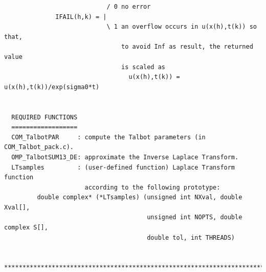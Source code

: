 \documentclass[a4paper,10pt]{report}%
\begin{document}
\begin{lstlisting}
                            / 0 no error
              IFAIL(h,k) = |
                            \ 1 an overflow occurs in u(x(h),t(k)) so that,
                                to avoid Inf as result, the returned value
                                is scaled as
                                  u(x(h),t(k)) = u(x(h),t(k))/exp(sigma0*t)


  REQUIRED FUNCTIONS
  ==================
  COM_TalbotPAR     : compute the Talbot parameters (in COM_Talbot_pack.c).
  OMP_TalbotSUM13_DE: approximate the Inverse Laplace Transform.
  LTsamples         : (user-defined function) Laplace Transform function
                      according to the following prototype:
         double complex* (*LTsamples) (unsigned int NXval, double Xval[],
                                       unsigned int NOPTS, double complex S[],
                                       double tol, int THREADS)

 *****************************************************************************\
\end{lstlisting}
\end{document}
